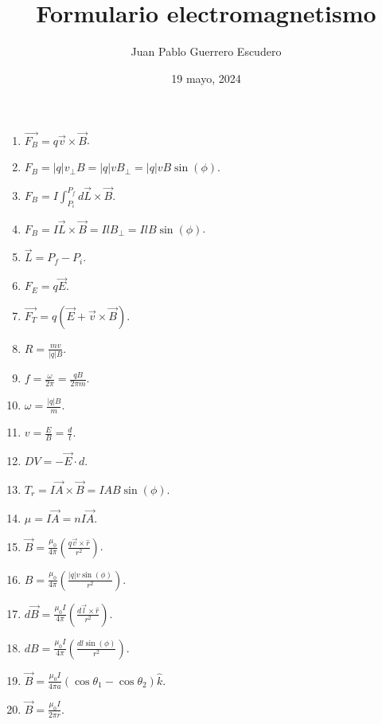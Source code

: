 \documentclass[12pt, letterpaper]{report}
\title{Formulario electromagnetismo}
\author{Juan Pablo Guerrero Escudero}
\date{19 mayo, 2024}
\begin{document}
\maketitle
\begin{multicols*}{3}
\begin{enumerate}
    \item $\vec{F_B} = q\vec{v} \times \vec{B}$.
    \item $F_B = |q|v_\perp B = |q| v B_\perp = |q| v B \sin(\phi)$.
    \item $F_B = I \int_{P_i}^{P_f} d\vec{L} \times \vec{B}$.
    \item $F_B = I\vec{L} \times \vec{B} = I l B_\perp = I l B \sin(\phi)$.
    \item $\vec{L} = P_f - P_i$.
    \item $F_E = q\vec{E}$.
    \item $\vec{F_T} = q(\vec{E} + \vec{v} \times \vec{B})$.
    \item $R = \frac{mv}{|q|B}$.
    \item $f = \frac{\omega}{2\pi} = \frac{qB}{2\pi m}$.
    \item $\omega = \frac{|q|B}{m}$.
    \item $v = \frac{E}{B} = \frac{d}{t}$.
    \item $DV = -\vec{E} \cdot d$.
    \item $T_r = I\vec{A} \times \vec{B} = IA B \sin(\phi)$.
    \item $\mu = I\vec{A} = nI\vec{A}$.
    \item $\vec{B} = \frac{\mu_0}{4\pi}\left(\frac{q \vec{v} \times \hat{r}}{r^2}\right)$.
    \item $B = \frac{\mu_0}{4\pi}\left(\frac{|q|v \sin(\phi)}{r^2}\right)$.
    \item $d\vec{B} = \frac{\mu_0 I}{4\pi}\left(\frac{d\vec{l} \times \hat{r}}{r^2}\right)$.
    \item $dB = \frac{\mu_0 I}{4\pi}\left(\frac{dl \sin(\phi)}{r^2}\right)$.
    \item $\vec{B} = \frac{\mu_0 I}{4\pi a}(\cos{\theta_1} - \cos{\theta_2}) \hat{k}$.
    \item $\vec{B} = \frac{\mu_0 I}{2\pi r}$.

\end{enumerate}
\end{multicols*}
\end{document}
